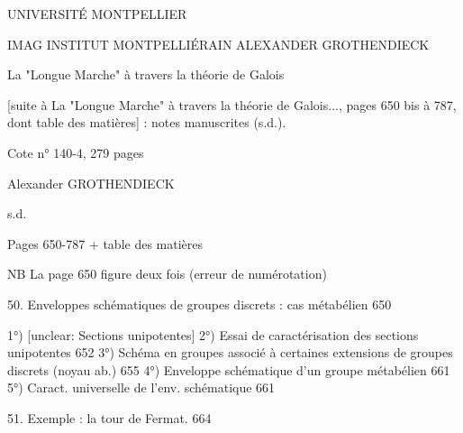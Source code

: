 

UNIVERSITÉ MONTPELLIER

IMAG
INSTITUT MONTPELLIÉRAIN
ALEXANDER GROTHENDIECK

La "Longue Marche" à travers la théorie de Galois

[suite à La "Longue Marche" à travers la théorie de Galois..., pages 650 bis à 787, dont
table des matières] : notes manuscrites (s.d.).

Cote n° 140-4, 279 pages

Alexander GROTHENDIECK

s.d.

\newpage


Pages 650-787 + table des matières

NB La page 650 figure deux fois (erreur de numérotation)

\newpage


50. Enveloppes schématiques de groupes discrets : cas métabélien 650

1°) [unclear: Sections unipotentes]
2°) Essai de caractérisation des sections unipotentes 652
3°) Schéma en groupes associé à certaines extensions de groupes discrets (noyau ab.) 655
4°) Enveloppe schématique d'un groupe métabélien 661
5°) Caract. universelle de l'env. schématique 661

51. Exemple : la tour de Fermat. 664

